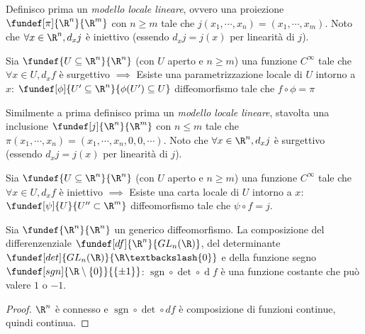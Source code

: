 Definisco prima un \emph{modello locale lineare}, ovvero una proiezione $\fundef[\pi]{\R^n}{\R^m}$ con $n \ge m$ tale che $j(x_1,\cdots,x_n)=(x_1,\cdots,x_m)$. Noto che $\forall x \in \R^n, d_xj$ è iniettivo (essendo $d_xj=j(x)$ per linearità di $j$).

\begin{teo}
\label{th:funimpsurg}
Sia $\fundef{U \subseteq \R^n}{\R^n}$ (con $U$ aperto e $n \ge m$) una funzione $C^\infty$ tale che $\forall x \in U, d_xf$ è surgettivo $\implies$ Esiste una parametrizzazione locale di $U$ intorno a $x$: $\fundef[\phi]{U'\subseteq \R^n}{\phi(U')\subseteq U}$ diffeomorfismo tale che $f \circ \phi = \pi$
\end{teo}

\begin{center}
\hspace{1cm}

\end{center}

Similmente a prima definisco prima un \emph{modello locale lineare}, stavolta una inclusione $\fundef[j]{\R^n}{\R^m}$ con $n \le m$ tale che $\pi(x_1,\cdots,x_n)=(x_1,\cdots,x_n,0,0,\cdots)$. Noto che $\forall x \in \R^n, d_xj$ è surgettivo (essendo $d_xj=j(x)$ per linearità di $j$).

\begin{teo}

Sia $\fundef{U \subseteq \R^n}{\R^n}$ (con $U$ aperto e $n \ge m$) una funzione $C^\infty$ tale che $\forall x \in U, d_xf$ è iniettivo $\implies$ Esiste una carta locale di $U$ intorno a $x$: $\fundef[\psi]{U}{U''\subset \R^m}$ diffeomorfismo tale che $\psi \circ f = j$.
\end{teo}

\begin{center}

\end{center}

\begin{prop}
Sia $\fundef{\R^n}{\R^n}$ un generico diffeomorfismo. La composizione del differenzenziale $\fundef[df]{\R^n}{GL_n(\R)}$, del determinante $\fundef[det]{GL_n(\R)}{\R\textbackslash\{0\}}$ e della funzione segno $\fundef[sgn]{\R\setminus\{0\}}{\{\pm1\}}$: $\operatorname{sgn} \circ \operatorname{det} \circ \operatorname{d}f$ è una funzione costante che può valere $1$ o $-1$.
\end{prop}

\begin{proof}
$\R^n$ è connesso e $\operatorname{sgn} \circ \operatorname{det} \circ df$ è composizione di funzioni continue, quindi continua.
\end{proof}

